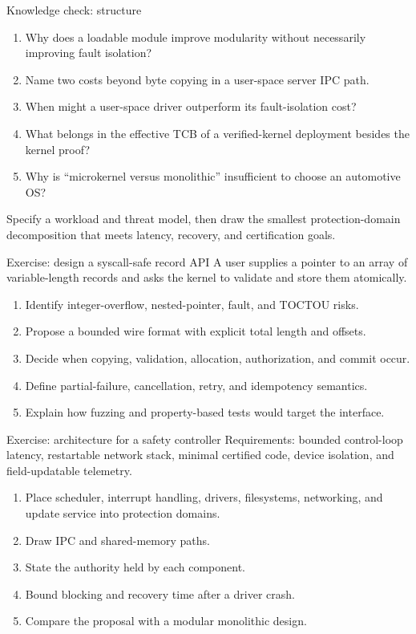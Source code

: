 \documentclass[aspectratio=169,11pt]{beamer}
\begin{document}
\begin{frame}{Knowledge check: structure}
  \begin{enumerate}
    \item Why does a loadable module improve modularity without necessarily improving fault isolation?
    \item Name two costs beyond byte copying in a user-space server IPC path.
    \item When might a user-space driver outperform its fault-isolation cost?
    \item What belongs in the effective TCB of a verified-kernel deployment besides the kernel proof?
    \item Why is ``microkernel versus monolithic'' insufficient to choose an automotive OS?
  \end{enumerate}
  \begin{tcolorbox}[title=Discussion extension]
    Specify a workload and threat model, then draw the smallest protection-domain decomposition that meets latency, recovery, and certification goals.
  \end{tcolorbox}
\end{frame}

\begin{frame}{Exercise: design a syscall-safe record API}
  A user supplies a pointer to an array of variable-length records and asks the kernel to validate and store them atomically.
  \begin{enumerate}
    \item Identify integer-overflow, nested-pointer, fault, and TOCTOU risks.
    \item Propose a bounded wire format with explicit total length and offsets.
    \item Decide when copying, validation, allocation, authorization, and commit occur.
    \item Define partial-failure, cancellation, retry, and idempotency semantics.
    \item Explain how fuzzing and property-based tests would target the interface.
  \end{enumerate}
\end{frame}

\begin{frame}{Exercise: architecture for a safety controller}
  Requirements: bounded control-loop latency, restartable network stack, minimal certified code, device isolation, and field-updatable telemetry.
  \begin{enumerate}
    \item Place scheduler, interrupt handling, drivers, filesystems, networking, and update service into protection domains.
    \item Draw IPC and shared-memory paths.
    \item State the authority held by each component.
    \item Bound blocking and recovery time after a driver crash.
    \item Compare the proposal with a modular monolithic design.
  \end{enumerate}
\end{frame}
\end{document}
